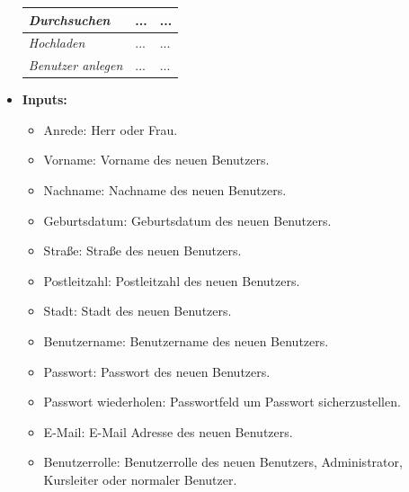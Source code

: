 \begin{itemize}
\begin{center}
\begin{longtable}{|p{4cm} |p{6cm} | p{4cm}|}
					\textit{Durchsuchen} & ... & ... \\ \hline
					\textit{Hochladen} &  ... & ... \\ \hline
					\textit{Benutzer anlegen} & ... & ... \\ \hline
				\end{longtable}
			\end{center}
			\item \textbf{Inputs:}
			\begin{itemize}
				\item Anrede: Herr oder Frau.
				\item Vorname: Vorname des neuen Benutzers.
				\item Nachname: Nachname des neuen Benutzers.
				\item Geburtsdatum: Geburtsdatum des neuen Benutzers.
				\item Straße: Straße des neuen Benutzers.
				\item Postleitzahl: Postleitzahl des neuen Benutzers.
				\item Stadt: Stadt des neuen Benutzers.
				\item Benutzername: Benutzername des neuen Benutzers.
				\item Passwort: Passwort des neuen Benutzers.
				\item Passwort wiederholen: Passwortfeld um Passwort sicherzustellen.
				\item E-Mail: E-Mail Adresse des neuen Benutzers.
				\item Benutzerrolle: Benutzerrolle des neuen Benutzers, Administrator, Kursleiter oder normaler Benutzer.
				\end{itemize}
				
				\begin{center}
					\begin{longtable}{|p{3cm} |p{4cm} | p{4cm}|p{3cm} |p{2cm}|}
						

\end{longtable}
\end{center}
\end{itemize}
